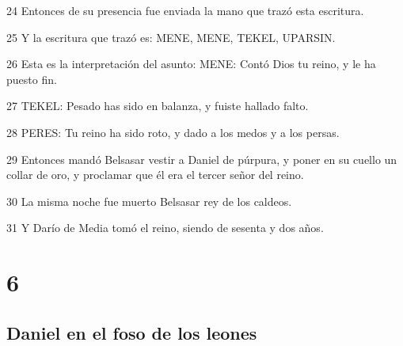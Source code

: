 \par 24 Entonces de su presencia fue enviada la mano que trazó esta escritura.
\par 25 Y la escritura que trazó es: MENE, MENE, TEKEL, UPARSIN.
\par 26 Esta es la interpretación del asunto: MENE: Contó Dios tu reino, y le ha puesto fin.
\par 27 TEKEL: Pesado has sido en balanza, y fuiste hallado falto.
\par 28 PERES: Tu reino ha sido roto, y dado a los medos y a los persas.
\par 29 Entonces mandó Belsasar vestir a Daniel de púrpura, y poner en su cuello un collar de oro, y proclamar que él era el tercer señor del reino.
\par 30 La misma noche fue muerto Belsasar rey de los caldeos.
\par 31 Y Darío de Media tomó el reino, siendo de sesenta y dos años. 

\chapter{6}

\section*{Daniel en el foso de los leones}


